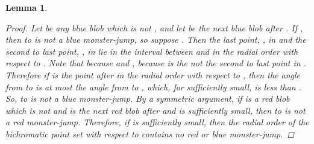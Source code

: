 \documentclass[12pt]{article}
\newtheorem{lemma}{Lemma}
\theoremstyle{definition}
\begin{document}
\begin{lemma}
\begin{proof}
    Let  be any blue blob which is not , and let  be the next blue blob after .
    If , then  to  is not a blue monster-jump, so suppose .
    Then the last point, , in  and the second to last point, , in  lie in the interval between  and  in the radial order with respect to .
    Note that  because  and , because  is the not the second to last point in .
    Therefore if  is the point after  in the radial order with respect to , then the angle from  to  is at most the angle from  to , which, for  sufficiently small, is less than .
    So,  to  is not a blue monster-jump.
    By a symmetric argument, if  is a red blob which is not  and  is the next red blob after  and  is sufficiently small, then  to  is not a red monster-jump.
    Therefore, if  is sufficiently small, then the radial order of the bichromatic point set with respect to  contains no red or blue monster-jump.
  \end{proof}
\end{lemma}
\end{document}
